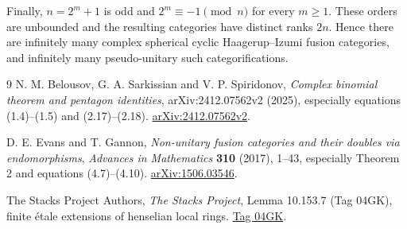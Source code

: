 \documentclass[11pt]{article}
\numberwithin{equation}{section}
\theoremstyle{definition}
\theoremstyle{remark}
\begin{document}
Finally, $n=2^m+1$ is odd and $2^m\equiv-1\pmod n$ for every
$m\ge1$.  These orders are unbounded and the resulting
categories have distinct ranks $2n$.  Hence there are
infinitely many complex spherical cyclic Haagerup--Izumi
fusion categories, and infinitely many pseudo-unitary such
categorifications.

\begingroup
\small
\begin{thebibliography}{9}
\setlength{\itemsep}{3pt}
N. M. Belousov, G. A. Sarkissian and V. P. Spiridonov,
\emph{Complex binomial theorem and pentagon identities},
arXiv:2412.07562v2 (2025), especially equations (1.4)--(1.5) and (2.17)--(2.18).
\href{https://arxiv.org/abs/2412.07562v2}{arXiv:2412.07562v2}.

D. E. Evans and T. Gannon,
\emph{Non-unitary fusion categories and their doubles via endomorphisms},
\emph{Advances in Mathematics} \textbf{310} (2017), 1--43,
especially Theorem 2 and equations (4.7)--(4.10).
\href{https://arxiv.org/abs/1506.03546}{arXiv:1506.03546}.

The Stacks Project Authors, \emph{The Stacks Project},
Lemma 10.153.7 (Tag 04GK), finite \'etale extensions of henselian local rings.
\href{https://stacks.math.columbia.edu/tag/04GK}{Tag 04GK}.
\end{thebibliography}
\endgroup
\end{document}
